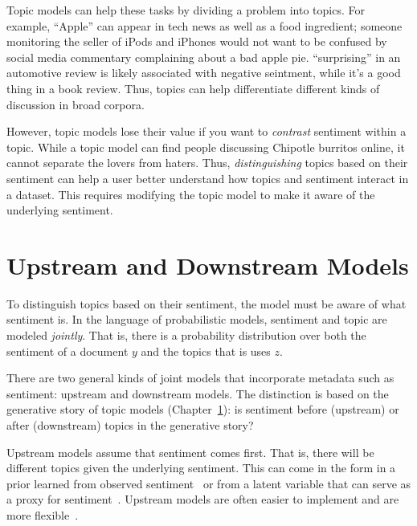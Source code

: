 Topic models can help these tasks by dividing a problem into topics.
For example, ``Apple'' can appear in tech news as well as a food
ingredient; someone monitoring the seller of iPods and iPhones would
not want to be confused by social media commentary complaining about a
bad apple pie.  ``surprising'' in an automotive review is likely
associated with negative seintment, while it's a good thing in a book
review.  Thus, topics can help differentiate different kinds of
discussion in broad corpora.

However, topic models lose their value if you want to \emph{contrast}
sentiment within a topic.  While a topic model can find people
discussing Chipotle burritos online, it cannot separate the lovers from
haters.  Thus, \emph{distinguishing} topics based on their sentiment
can help a user better understand how topics and sentiment interact in
a dataset.  This requires modifying the topic model to make it aware
of the underlying sentiment.


\section{Upstream and Downstream Models}

To distinguish topics based on their sentiment, the model must be
aware of what sentiment is.  In the language of probabilistic models,
sentiment and topic are modeled \emph{jointly}.  That is, there is a
probability distribution over both the sentiment of a document $y$ and
the topics that is uses $z$.

There are two general kinds of joint models that incorporate metadata
such as sentiment: upstream and downstream models.  The distinction is
based on the generative story of topic models (Chapter~\ref{}): is
sentiment before (upstream) or after (downstream) topics in the
generative story?


Upstream models assume that sentiment comes first.  That is, there
will be different topics given the underlying sentiment.  This can
come in the form in a prior learned from observed
sentiment~\citep{mimno-08} or from a latent variable that can serve as
a proxy for sentiment~\citep{lin-09}.  Upstream models are often
easier to implement and are more flexible~\citep{stewart-14}.

